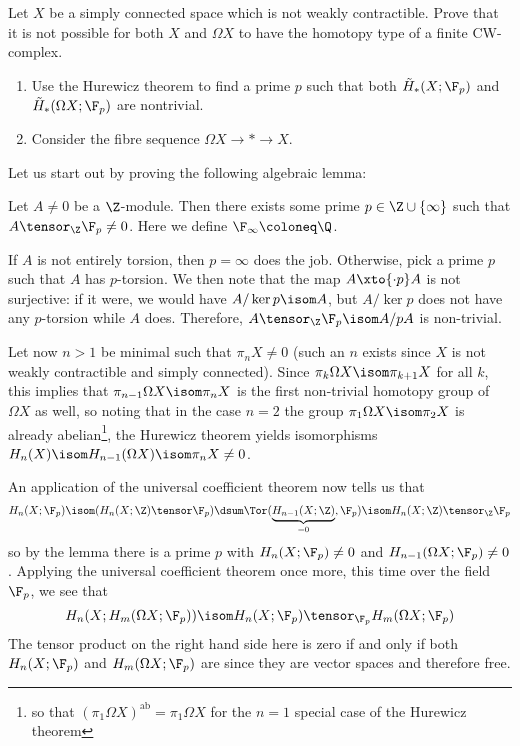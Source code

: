 \begin{exercise}
	Let $X$ be a simply connected space which is not weakly contractible.
	Prove that it is not possible for both $X$ and $\Omega X$ to have the homotopy type of a finite CW-complex.
	\begin{hint}
		\leavevmode
		\begin{enumerate}
			\item Use the Hurewicz theorem to find a prime $p$ such that both $\tilde{H}_*(X; \F_p)$ and $\tilde{H}_*(\Omega X; \F_p)$ are nontrivial.
			\item Consider the fibre sequence $\Omega X \to * \to X$.
		\end{enumerate}
	\end{hint}
\end{exercise}
\begin{solution}
	Let us start out by proving the following algebraic lemma:
	\begin{lemma}
		Let $A \neq 0$ be a $\Z$-module.
		Then there exists some prime $p \in \Z \cup \{\infty\}$ such that $A \tensor_{\Z} \F_p \neq 0$.
		Here we define $\F_\infty \coloneq \Q$.
	\end{lemma}
	\begin{smallproof}
		If $A$ is not entirely torsion, then $p = \infty$ does the job.
		Otherwise, pick a prime $p$ such that $A$ has $p$-torsion.
		We then note that the map $A \xto{\cdot p} A$ is not surjective: if it were, we would have $A / \ker p \isom A$, but $A / \ker p$ does not have any $p$-torsion while $A$ does.
		Therefore, $A \tensor_{\Z} \F_p \isom A / p A$ is non-trivial.
	\end{smallproof}
	Let now $n > 1$ be minimal such that $\pi_n X \neq 0$ (such an $n$ exists since $X$ is not weakly contractible and simply connected).
	Since $\pi_k \Omega X \isom \pi_{k + 1} X$ for all $k$, this implies that $\pi_{n - 1} \Omega X \isom \pi_n X$ is the first non-trivial homotopy group of $\Omega X$ as well, so noting that in the case $n = 2$ the group $\pi_1 \Omega X \isom \pi_2 X$ is already abelian\footnote{so that $(\pi_1 \Omega X)^\text{ab} = \pi_1 \Omega X$ for the $n = 1$ special case of the Hurewicz theorem}, the Hurewicz theorem yields isomorphisms $H_n(X) \isom H_{n - 1}(\Omega X) \isom \pi_n X \neq 0$.

	An application of the universal coefficient theorem now tells us that
	\begin{equation*}
		H_n(X; \F_p) \isom (H_n(X; \Z) \tensor \F_p) \dsum \Tor(\underbrace{H_{n - 1}(X; \Z)}_{= 0}, \F_p) \isom H_n(X; \Z) \tensor_{\Z} \F_p
	\end{equation*}
	so by the lemma there is a prime $p$ with $H_n(X; \F_p) \neq 0$ and $H_{n - 1}(\Omega X; \F_p) \neq 0$. Applying the universal coefficient theorem once more, this time over the field $\F_p$, we see that 
	\begin{equation*}
		H_n(X; H_m(\Omega X; \F_p)) \isom H_n(X; \F_p) \tensor_{\F_p} H_m(\Omega X; \F_p)
	\end{equation*}
	The tensor product on the right hand side here is zero if and only if both $H_n(X; \F_p)$ and $H_m(\Omega X; \F_p)$ are since they are vector spaces and therefore free.


\end{solution}
